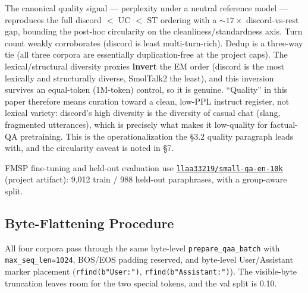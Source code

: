 \documentclass[11pt]{article}
\begin{document}
The canonical quality signal --- perplexity under a neutral reference model --- reproduces the full discord $<$ UC $<$ ST ordering with a $\sim$$17\times$ discord-vs-rest gap, bounding the post-hoc circularity on the cleanliness/standardness axis. Turn count weakly corroborates (discord is least multi-turn-rich). Dedup is a three-way tie (all three corpora are essentially duplication-free at the project caps). The lexical/structural diversity proxies \textbf{invert} the EM order (discord is the most lexically and structurally diverse, SmolTalk2 the least), and this inversion survives an equal-token (1M-token) control, so it is genuine. ``Quality'' in this paper therefore means curation toward a clean, low-PPL instruct register, not lexical variety: discord's high diversity is the diversity of casual chat (slang, fragmented utterances), which is precisely what makes it low-quality for factual-QA pretraining. This is the operationalization the \S3.2 quality paragraph leads with, and the circularity caveat is noted in \S7.

FMSP fine-tuning and held-out evaluation use \href{https://huggingface.co/datasets/llaa33219/small-qa-en-10k}{\texttt{llaa33219/small-qa-en-10k}} (project artifact): 9,012 train / 988 held-out paraphrases, with a group-aware split.

\subsection{Byte-Flattening Procedure}

All four corpora pass through the same byte-level \texttt{prepare\_qaa\_batch} with \texttt{max\_seq\_len=1024}, BOS/EOS padding reserved, and byte-level User/Assistant marker placement (\texttt{rfind(b"User:")}, \texttt{rfind(b"Assistant:")}). The visible-byte truncation leaves room for the two special tokens, and the val split is 0.10.
\end{document}
